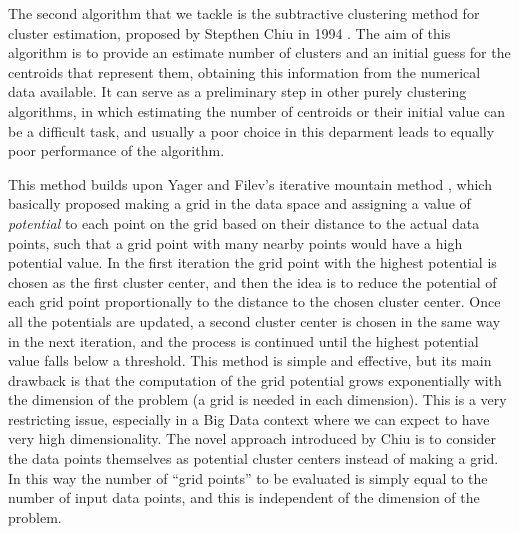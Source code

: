 The second algorithm that we tackle is the subtractive clustering method for cluster estimation, proposed by Stepthen Chiu in 1994 \cite{chiu1994identification}. The aim of this algorithm is to provide an estimate number of clusters and an initial guess for the centroids that represent them, obtaining this information from the numerical data available. It can serve as a preliminary step in other purely clustering algorithms, in which estimating the number of centroids or their initial value can be a difficult task, and usually a poor choice in this deparment leads to equally poor performance of the algorithm.

This method builds upon Yager and Filev's iterative mountain method \cite{yager1994approximate}, which basically proposed making a grid in the data space and assigning a value of \textit{potential} to each point on the grid based on their distance to the actual data points, such that a grid point with many nearby points would have a high potential value. In the first iteration the grid point with the highest potential is chosen as the first cluster center, and then the idea is to reduce the potential of each grid point proportionally to the distance to the chosen cluster center. Once all the potentials are updated, a second cluster center is chosen in the same way in the next iteration, and the process is continued until the highest potential value falls below a threshold. This method is simple and effective, but its main drawback is that the computation of the grid potential grows exponentially with the dimension of the problem (a grid is needed in each dimension). This is a very restricting issue, especially in a Big Data context where we can expect to have very high dimensionality. The novel approach introduced by Chiu is to consider the data points themselves as potential cluster centers instead of making a grid. In this way the number of ``grid points'' to be evaluated is simply equal to the number of input data points, and this is independent of the dimension of the problem.

